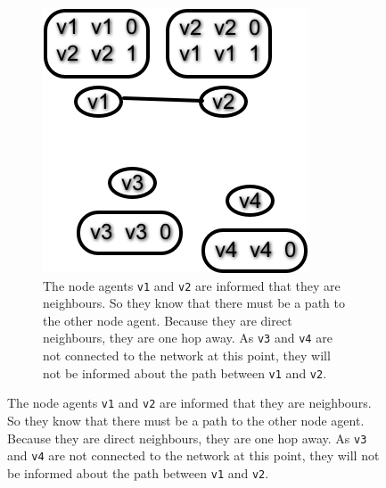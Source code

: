 \begin{figure}
\begin{subfigure}{.45\textwidth}
        \includegraphics[width=\textwidth] {images/dv1.png}
        \caption{The node agents \texttt{v1} and \texttt{v2} are informed that they are neighbours.
                 So they know that there must be a path to the other node agent.
                 Because they are direct neighbours, they are one hop away.
                 As \texttt{v3} and \texttt{v4} are not connected to the network at this point, they will not be informed about the path between \texttt{v1} and \texttt{v2}.}
    \end{subfigure}


\end{figure}
